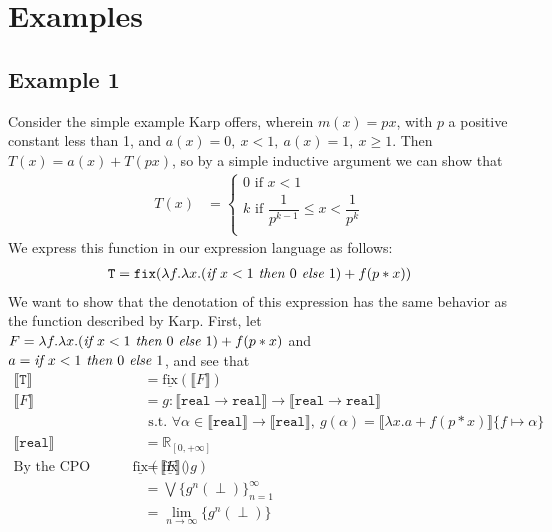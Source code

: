 \documentclass{westhesis}
\theoremstyle{plain}
\theoremstyle{definition}
\newcommand{\R}{\mathbb{R}}
\begin{document}
\section{Examples}
\subsection{Example 1}
Consider the simple example Karp offers, wherein $m(x) = px$, with $p$ a positive constant less than 1, and $a(x) = 0, \ x < 1, \ a(x) = 1, \ x \geq 1$. Then $T(x) = a(x) + T(px)$, so by a simple inductive argument we can show that 
\begin{align*}
T(x) &= 
 \begin{cases}
 0 \text{ if } x < 1 \\
 k \text{ if }  \dfrac{1}{p^{k-1}} \leq x < \dfrac{1}{p^k} \\
 \end{cases}
 \end{align*}
 We express this function in our expression language as follows: 
 \begin{align*}
 \texttt{T} = \texttt{fix}(\lambda f. \lambda x. (\emph{if } x<1 \emph{ then } 0 \emph{ else } 1) + f (p * x))
 \end{align*}
 We want to show that the denotation of this expression has the same behavior as the function described by Karp. First, let $F 
 = \lambda f. \lambda x. (\emph{if } x<1 \emph{ then } 0 \emph{ else } 1) + f (p * x)$ and \\ $a = \emph{if } x<1 \emph{ then } 0 
 \emph{ else } 1$, and see that 
 \begin{align*}
 \llbracket \texttt{T} \rrbracket &= \underline{\text{fix}}(\llbracket F \rrbracket) \\
 \llbracket F \rrbracket &= g : \llbracket \texttt{real} \rightarrow \texttt{real}\rrbracket \rightarrow \llbracket \texttt{real} \rightarrow 
 \texttt{real}\rrbracket \\ &\text{ \ \ \ s.t. } \forall \alpha \in \llbracket \texttt{real}\rrbracket \rightarrow \llbracket \texttt{real}
 \rrbracket, \ 
 g(\alpha) = \llbracket \lambda x.a + f (p * x)\rrbracket\{f \mapsto \alpha\} \\
 \llbracket \texttt{real}\rrbracket &= \R_{[0, +\infty]}  
 \\\text{By the CPO fixpoint theorem, } \underline{\text{fix}}(\llbracket F \rrbracket) &= \underline{\text{fix}}(g) \\
&= \bigvee\{g^n (\perp)\}^{\infty}_{n=1} \\
&= \lim_{n \to \infty}\{g^n (\perp)\}
 \end{align*}
\end{document}
